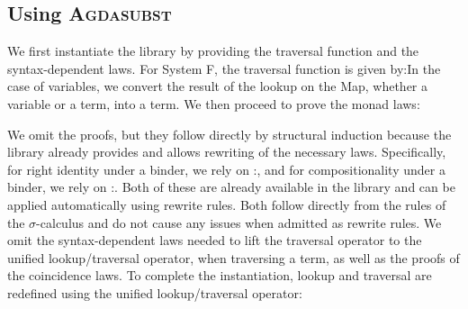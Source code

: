 \documentclass[screen,nonacm]{acmart}
\begin{document}
\subsection*{Using \textsc{Agdasubst}}
We first instantiate the library by providing the traversal function and the
syntax-dependent laws. For System F, the traversal function is given
by:\SFTraversal{}In the case of variables, we convert the result of the lookup
on the Map, whether a variable or a term, into a term. We then proceed to prove
the monad laws:

\noindent\begin{minipage}[t]{0.48\linewidth}
      \small
      \raggedright{}
      \SFId{}
\end{minipage}
\begin{minipage}[t]{0.48\linewidth}
      \small
      \raggedright{}
      \SFCompo{}
\end{minipage}

\noindent We omit the proofs, but they follow directly by structural induction because
the library already provides and allows rewriting of the necessary laws.
Specifically, for right identity under a binder, we rely on
\;:\;\AIdLift{}, and for compositionality under a binder, we
rely on \;:\;\ADistLift{}. Both of these are already
available in the library and can be applied automatically using rewrite rules.
Both follow directly from the rules of the $σ$-calculus and do not cause any issues when admitted as rewrite rules.
We omit the syntax-dependent laws needed to lift the traversal operator to the unified lookup/traversal operator, when traversing a term, as well as the proofs of the coincidence laws. To complete the instantiation, lookup and traversal are redefined using the unified lookup/traversal operator:

\noindent \begin{minipage}[t]{0.48\linewidth}
      \small
      \raggedright{}
      \SFLookupSH{}
\end{minipage}
\begin{minipage}[t]{0.48\linewidth}
      \small
      \raggedright{}
      \SFTraversalSH{}
\end{minipage}
\end{document}

